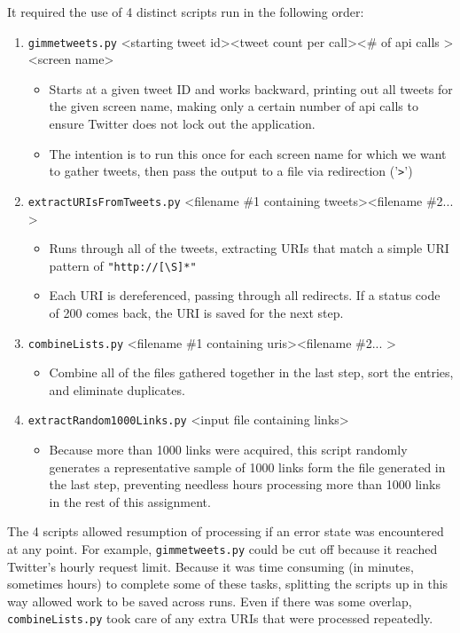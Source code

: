 \documentclass[letterpaper,11pt]{article}
\begin{document}
It required the use of 4 distinct scripts run in the following order:
\begin{enumerate}
\item \verb+gimmetweets.py+ \textless starting tweet id\textgreater \textless tweet count per call\textgreater \textless \# of api calls \textgreater \textless screen name\textgreater
	\begin{itemize}
	\item Starts at a given tweet ID and works backward, printing out all tweets for the given screen name, making only a certain number of api calls to ensure Twitter does not lock out the application.
	\item The intention is to run this once for each screen name for which we want to gather tweets, then pass the output to a file via redirection ('\verb+>+')
	\end{itemize}
\item \verb+extractURIsFromTweets.py+ \textless filename \#1 containing tweets\textgreater \textless filename \#2... \textgreater
	\begin{itemize}
	\item Runs through all of the tweets, extracting URIs that match a simple URI pattern of \verb+"http://[\S]*"+
	\item Each URI is dereferenced, passing through all redirects.  If a status code of 200 comes back, the URI is saved for the next step.
	\end{itemize}
\item \verb+combineLists.py+ \textless filename \#1 containing uris\textgreater \textless filename \#2... \textgreater
	\begin{itemize}
	\item Combine all of the files gathered together in the last step, sort the entries, and eliminate duplicates.
	\end{itemize}
\item \verb+extractRandom1000Links.py+ \textless input file containing links\textgreater
	\begin{itemize}
	\item Because more than 1000 links were acquired, this script randomly generates a representative sample of 1000 links form the file generated in the last step, preventing needless hours processing more than 1000 links in the rest of this assignment.
	\end{itemize}
\end{enumerate}

The 4 scripts allowed resumption of processing if an error state was encountered at any point.  For example, \verb+gimmetweets.py+ could be cut off because it reached Twitter's hourly request limit.  Because it was time consuming (in minutes, sometimes hours) to complete some of these tasks, splitting the scripts up in this way allowed work to be saved across runs.  Even if there was some overlap, \verb+combineLists.py+ took care of any extra URIs that were processed repeatedly.
\end{document}
